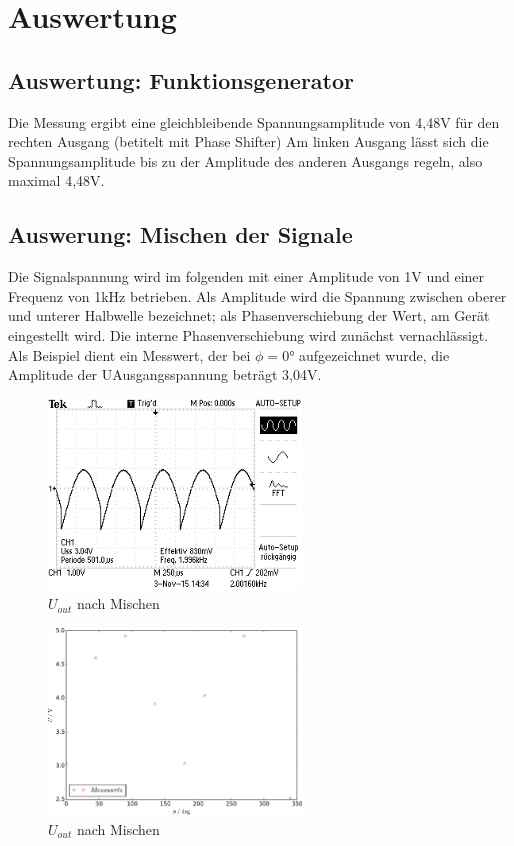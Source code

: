 \section{Auswertung}
\label{sec:Auswertung}

\subsection{Auswertung: Funktionsgenerator}
Die Messung ergibt eine gleichbleibende Spannungsamplitude von 4,48V für den
rechten Ausgang (betitelt mit Phase Shifter)
Am linken Ausgang lässt sich die Spannungsamplitude bis zu der Amplitude des
anderen Ausgangs regeln, also maximal 4,48V.

\subsection{Auswerung: Mischen der Signale}

Die Signalspannung wird im folgenden mit einer Amplitude von 1V und einer
Frequenz von 1kHz betrieben. Als Amplitude wird die Spannung zwischen
oberer und unterer Halbwelle bezeichnet; als Phasenverschiebung der Wert, am
Gerät eingestellt wird. Die interne Phasenverschiebung wird zunächst
vernachlässigt. Als Beispiel dient ein Messwert, der bei $\phi = 0°$
aufgezeichnet wurde, die Amplitude der UAusgangsspannung beträgt 3,04V.
\begin{figure}
  \centering
  \includegraphics[angle=90,keepaspectratio, width=0.6\textwidth]{graphics/ALL0031/F0031TEK.jpg}
  \caption{$U_{out}$ nach Mischen}
  \label{fig:2/phi0}
\end{figure}

\begin{figure}
  \centering
  \includegraphics[keepaspectratio, width=0.6\textwidth]{plot2u.pdf}
  \caption{$U_{out}$ nach Mischen}
  \label{fig:plot2u}
\end{figure}

